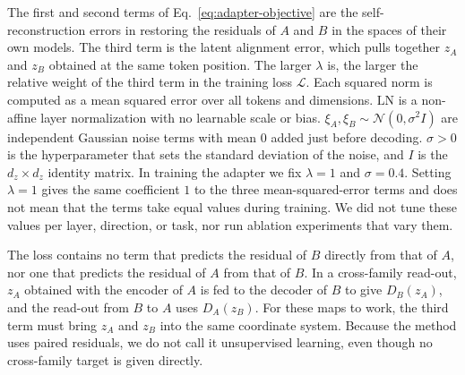 \documentclass[conference]{IEEEtran}
\begin{document}
The first and second terms of Eq.~\eqref{eq:adapter-objective} are the self-reconstruction errors in restoring the residuals of $A$ and
$B$ in the spaces of their own models. The third term is the latent alignment error, which pulls together $z_A$ and $z_B$ obtained at
the same token position. The larger $\lambda$ is, the larger the relative weight of the third term in the training loss $\mathcal L$.
Each squared norm is computed as a mean squared error over all tokens and dimensions.
$\mathrm{LN}$ is a non-affine layer normalization with no learnable scale or bias. $\xi_A,\xi_B\sim\mathcal N(0,\sigma^2 I)$
are independent Gaussian noise terms with mean $0$ added just before decoding. $\sigma>0$ is the hyperparameter that sets the standard
deviation of the noise, and $I$ is the $d_z{\times}d_z$ identity matrix.
In training the adapter we fix $\lambda{=}1$ and $\sigma{=}0.4$. Setting $\lambda{=}1$ gives the same coefficient $1$ to the three
mean-squared-error terms and does not mean that the terms take equal values during training. We did not tune these values per layer,
direction, or task, nor run ablation experiments that vary them.

The loss contains no term that predicts the residual of $B$ directly from that of $A$, nor one that predicts the residual of $A$ from that of $B$. In a cross-family
read-out, $z_A$ obtained with the encoder of $A$ is fed to the decoder of $B$ to give $D_B(z_A)$, and the read-out from $B$ to $A$ uses
$D_A(z_B)$. For these maps to work, the third term must bring $z_A$ and $z_B$ into the same coordinate system. Because the method uses
paired residuals, we do not call it unsupervised learning, even though no cross-family target is given directly.
\end{document}
